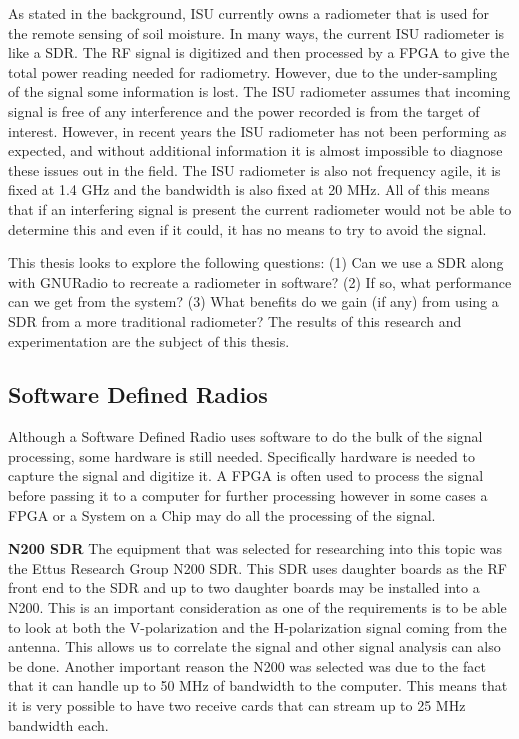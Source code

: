 As stated in the background, ISU currently owns a radiometer that is used for the remote sensing of soil moisture.  In many ways, the current ISU radiometer is like a SDR.  The RF signal is digitized and then processed by a FPGA to give the total power reading needed for radiometry.  However, due to the under-sampling of the signal some information is lost.  The ISU radiometer assumes that incoming signal is free of any interference and the power recorded is from the target of interest.  However, in recent years the ISU radiometer has not been performing as expected, and without additional information it is almost impossible to diagnose these issues out in the field.  The ISU radiometer is also not frequency agile, it is fixed at 1.4 GHz and the bandwidth is also fixed at 20 MHz.  All of this means that if an interfering signal is present the current radiometer would not be able to determine this and even if it could, it has no means to try to avoid the signal.  

This thesis looks to explore the following questions: (1) Can we use a SDR along with GNURadio to recreate a radiometer in software?  (2) If so, what performance can we get from the system?  (3) What benefits do we gain (if any) from using a SDR from a more traditional radiometer?  The results of this research and experimentation are the subject of this thesis.


\subsection{Software Defined Radios}

Although a Software Defined Radio uses software to do the bulk of the signal processing, some hardware is still needed.  Specifically hardware is needed to capture the signal and digitize it.  A FPGA is often used to process the signal before passing it to a computer for further processing however in some cases a FPGA or a System on a Chip may do all the processing of the signal.

\textbf{N200 SDR} The equipment that was selected for researching into this topic was the Ettus Research Group N200 SDR.  This SDR uses daughter boards as the RF front end to the SDR and up to two daughter boards may be installed into a N200.  This is an important consideration as one of the requirements is to be able to look at both the V-polarization and the H-polarization signal coming from the antenna.  This allows us to correlate the signal and other signal analysis can also be done.  Another important reason the N200 was selected was due to the fact that it can handle up to 50 MHz of bandwidth to the computer.  This means that it is very possible to have two receive cards that can stream up to 25 MHz bandwidth each.  

